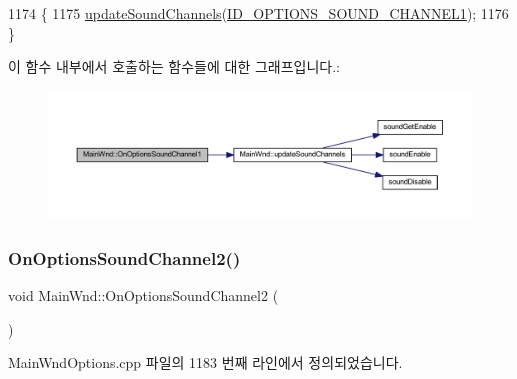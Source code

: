\begin{DoxyCode}
1174 \{
1175   \mbox{\hyperlink{class_main_wnd_a30b67d9db53d79122684a81e549ebd1c}{updateSoundChannels}}(\mbox{\hyperlink{resource_8h_a83883765782ec73d31d7964f7eb9fbce}{ID\_OPTIONS\_SOUND\_CHANNEL1}});
1176 \}
\end{DoxyCode}
이 함수 내부에서 호출하는 함수들에 대한 그래프입니다.\+:
\nopagebreak
\begin{figure}[H]
\begin{center}
\leavevmode
\includegraphics[width=350pt]{class_main_wnd_a6a21a6e3756553868f1792f371e7c468_cgraph}
\end{center}
\end{figure}
\mbox{\label{class_main_wnd_a4f31de4544cb10e41968ccabfec95422}} 
\subsubsection{\texorpdfstring{On\+Options\+Sound\+Channel2()}{OnOptionsSoundChannel2()}}
{\footnotesize\ttfamily void Main\+Wnd\+::\+On\+Options\+Sound\+Channel2 (\begin{DoxyParamCaption}{ }\end{DoxyParamCaption})\hspace{0.3cm}{\ttfamily [protected]}}



Main\+Wnd\+Options.\+cpp 파일의 1183 번째 라인에서 정의되었습니다.


